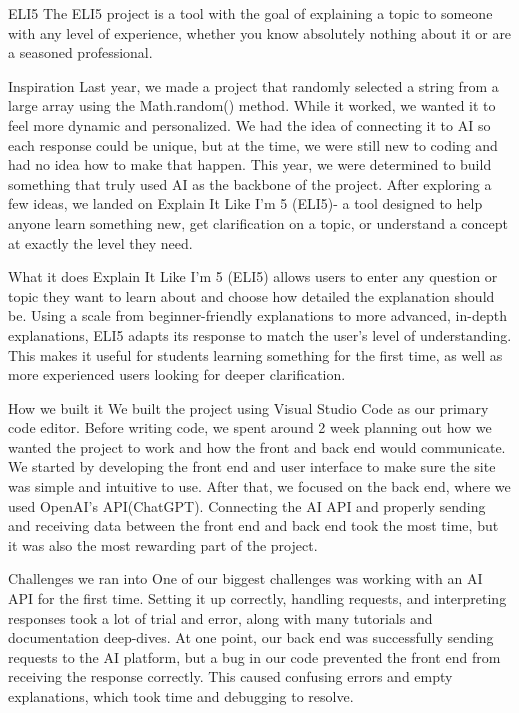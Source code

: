 ELI5
The ELI5 project is a tool with the goal of explaining a topic to someone with any level of experience, whether you know absolutely nothing about it or are a seasoned professional.

Inspiration
Last year, we made a project that randomly selected a string from a large array using the Math.random() method. While it worked, we wanted it to feel more dynamic and personalized. We had the idea of connecting it to AI so each response could be unique, but at the time, we were still new to coding and had no idea how to make that happen. This year, we were determined to build something that truly used AI as the backbone of the project. After exploring a few ideas, we landed on Explain It Like I’m 5 (ELI5)- a tool designed to help anyone learn something new, get clarification on a topic, or understand a concept at exactly the level they need.

What it does
Explain It Like I’m 5 (ELI5) allows users to enter any question or topic they want to learn about and choose how detailed the explanation should be. Using a scale from beginner-friendly explanations to more advanced, in-depth explanations, ELI5 adapts its response to match the user’s level of understanding. This makes it useful for students learning something for the first time, as well as more experienced users looking for deeper clarification.

How we built it
We built the project using Visual Studio Code as our primary code editor. Before writing code, we spent around 2 week planning out how we wanted the project to work and how the front and back end would communicate. We started by developing the front end and user interface to make sure the site was simple and intuitive to use. After that, we focused on the back end, where we used OpenAI's API(ChatGPT). Connecting the AI API and properly sending and receiving data between the front end and back end took the most time, but it was also the most rewarding part of the project.

Challenges we ran into
One of our biggest challenges was working with an AI API for the first time. Setting it up correctly, handling requests, and interpreting responses took a lot of trial and error, along with many tutorials and documentation deep-dives. At one point, our back end was successfully sending requests to the AI platform, but a bug in our code prevented the front end from receiving the response correctly. This caused confusing errors and empty explanations, which took time and debugging to resolve.

